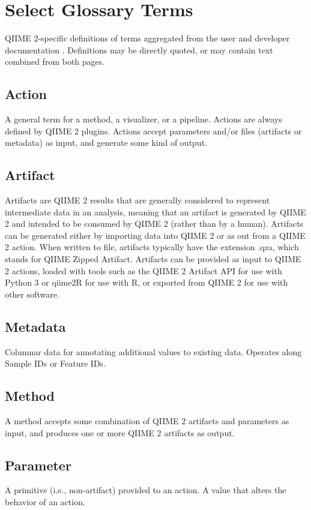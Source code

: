 \chapter{Select Glossary Terms}
\label{app:glossary}

QIIME 2-specific definitions of terms aggregated from the user \parencite{qiime_2_development_team_glossary_2016}
and developer documentation \parencite{qiime_2_development_team_glossary_2018}.
Definitions may be directly quoted, or may contain text combined from both pages.

\section*{Action}
\noindent A general term for a method, a visualizer, or a pipeline. Actions are always
defined by QIIME 2 plugins. Actions accept parameters and/or files (artifacts or
metadata) as input, and generate some kind of output.

\section*{Artifact}
\noindent Artifacts are QIIME 2 results that are generally considered to represent
intermediate data in an analysis, meaning that an artifact is generated by QIIME
2 and intended to be consumed by QIIME 2 (rather than by a human). Artifacts can
be generated either by importing data into QIIME 2 or as out from a QIIME 2
action. When written to file, artifacts typically have the extension .qza, which
stands for QIIME Zipped Artifact. Artifacts can be provided as input to QIIME 2
actions, loaded with tools such as the QIIME 2 Artifact API for use with Python
3 or qiime2R for use with R, or exported from QIIME 2 for use with other
software.

\section*{Metadata}
\noindent Columnar data for annotating additional values to existing data. Operates along
Sample IDs or Feature IDs.

\section*{Method}
\noindent A method accepts some combination of QIIME 2 artifacts and parameters as input,
and produces one or more QIIME 2 artifacts as output.

\section*{Parameter}
\noindent A primitive (i.e., non-artifact) provided to an action. A value that alters the
behavior of an action.

